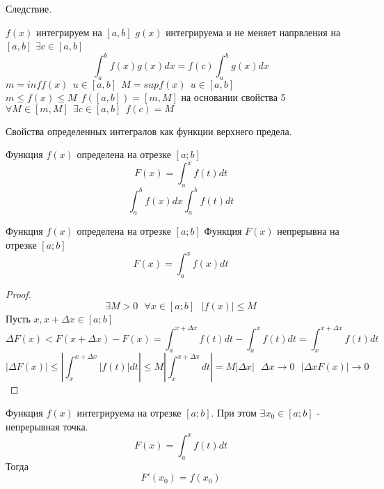 Следствие.\\
\begin{theorem}
    $f(x)$ интегрируем на $[a, b]$ $g(x)$ интегрируема и не меняет напрвления на
    $[a, b]$ $\exists c \in [a, b]$
    \[\int_a^b f(x)g(x)dx  = f(c) \int_a^b g(x)dx\]
    $m = inf f(x) ~~ u \in [a, b] ~~ M = sup f(x) ~~ u \in [a, b]$
    $m \le f(x) \le M ~~ f([a, b]) = [m, M]$ на основании свойства 5
    $\forall M \in [m, M] ~~ \exists c \in [a, b] ~~ f(c) = M$
\end{theorem}
\begin{title}
  Свойства определенных интегралов как функции верхнего предела.
\end{title}

Функция $f(x)$ определена на отрезке $[a; b]$
\[F(x) = \int^x_a f(t)dt\]
\[\int^b_a f(x)dx \int^b_a f(t)dt\]

\begin{theorem}[1]
  Функция $f(x)$ определена на отрезке $[a; b]$
  Функция $F(x)$ непрерывна на отрезке $[a; b]$
  \[F(x) = \int^x_a f(x)dt\]
\end{theorem}

\begin{proof}
  \[\exists M > 0 ~~~ \forall x \in [a; b] ~~~ |f(x)| \le M\]
  Пусть $x, x + \Delta x \in [a; b]$
  \[\Delta F(x) < F(x + \Delta x) - F(x) = \int^{x + \Delta x}_a f(t)dt -
    \int^x_a f(t)dt = \int^{x + \Delta x}_x f(t)dt\]
  \[|\Delta F(x)| \le \left |\int^{x + \Delta x}_x |f(t)|dt \right| \le
    M \left |\int^{x + \Delta x}_x dt \right| = M |\Delta x|
    ~~~ \Delta x \to 0 ~~~ |\Delta x F(x)| \to 0\]
\end{proof}

\begin{theorem}[2]
  Функция $f(x)$ интегрируема на отрезке $[a; b]$. При этом
  $\exists x_0 \in [a; b]$ - непрерывная точка.
  \[F(x) = \int^x_a f(t)dt\]
  Тогда
  \[F'(x_0) = f(x_0)\]
\end{theorem}

